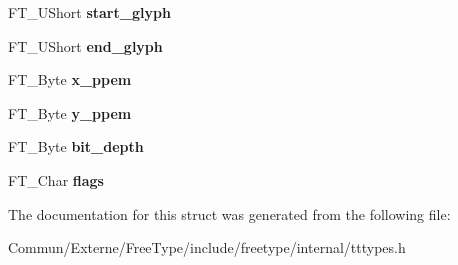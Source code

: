 \begin{DoxyCompactItemize}
\item 
F\+T\+\_\+\+U\+Short {\bfseries start\+\_\+glyph}\hypertarget{struct_t_t___s_bit___strike_rec___a05032d4092eef7e7214bb82d4113d8b9}{}\label{struct_t_t___s_bit___strike_rec___a05032d4092eef7e7214bb82d4113d8b9}

\item 
F\+T\+\_\+\+U\+Short {\bfseries end\+\_\+glyph}\hypertarget{struct_t_t___s_bit___strike_rec___a1af21e0ef936193b22575ea75bad487f}{}\label{struct_t_t___s_bit___strike_rec___a1af21e0ef936193b22575ea75bad487f}

\item 
F\+T\+\_\+\+Byte {\bfseries x\+\_\+ppem}\hypertarget{struct_t_t___s_bit___strike_rec___a2a1b17c24df2084fe485aefe8f34e7d4}{}\label{struct_t_t___s_bit___strike_rec___a2a1b17c24df2084fe485aefe8f34e7d4}

\item 
F\+T\+\_\+\+Byte {\bfseries y\+\_\+ppem}\hypertarget{struct_t_t___s_bit___strike_rec___ad618814b841b86e7763f1aa371e04fed}{}\label{struct_t_t___s_bit___strike_rec___ad618814b841b86e7763f1aa371e04fed}

\item 
F\+T\+\_\+\+Byte {\bfseries bit\+\_\+depth}\hypertarget{struct_t_t___s_bit___strike_rec___ac57b360af4620bd06251d098f5da23bb}{}\label{struct_t_t___s_bit___strike_rec___ac57b360af4620bd06251d098f5da23bb}

\item 
F\+T\+\_\+\+Char {\bfseries flags}\hypertarget{struct_t_t___s_bit___strike_rec___a38735f8c00b23deb25ffab798c0aa7b7}{}\label{struct_t_t___s_bit___strike_rec___a38735f8c00b23deb25ffab798c0aa7b7}

\end{DoxyCompactItemize}


The documentation for this struct was generated from the following file\+:\begin{DoxyCompactItemize}
\item 
Commun/\+Externe/\+Free\+Type/include/freetype/internal/tttypes.\+h\end{DoxyCompactItemize}
